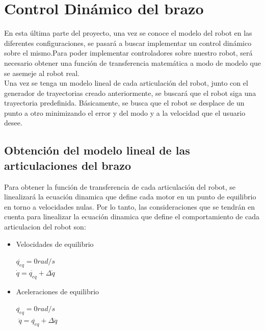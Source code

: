 \section{Control Dinámico del brazo}
En esta última parte del proyecto, una vez se conoce el modelo del robot en las diferentes configuraciones, se pasará a buscar implementar un control dinámico sobre el mismo.Para poder implementar controladores sobre nuestro robot, será necesario obtener una función de transferencia matemática a modo de modelo que se asemeje al robot real.\\
Una vez se tenga un modelo lineal de cada articulación del robot, junto con el generador de trayectorias creado anteriormente, se buscará que el robot siga una trayectoria predefinida. Básicamente, se busca que el robot se desplace de un punto a otro minimizando el error y del modo y a la velocidad que el usuario desee.\\

	\subsection{Obtención del modelo lineal de las articulaciones del brazo}
Para obtener la función de transferencia de cada articulación del robot, se linealizará la ecuación dinamica que define cada motor en un punto de equilibrio en torno a velocidades nulas. Por lo tanto, las consideraciones que se tendrán en cuenta para linealizar la ecuación dinamica que define el comportamiento de cada articulacion del robot son:
\begin{itemize}
	\item Velocidades de equilibrio
	\begin{center}
		$ \dot{q_{eq}}=0 rad/s $\\
		$ \dot{q} =\dot{q_{eq}}+\Delta\dot{q}$
	\end{center}
	\item Aceleraciones de equilibrio
\begin{center}
	$ \ddot{q_{eq}}=0 rad/s $\\
	$  $
	$ \ddot{q} =\ddot{q_{eq}}+\Delta\ddot{q}$
\end{center}
\end{itemize}

